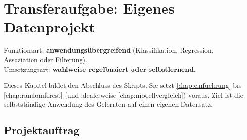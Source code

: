 \chapter{Transferaufgabe: Eigenes Datenprojekt}
\label{chap:transfer}

\begin{myremark}
Funktionsart: \textbf{anwendungsübergreifend} (Klassifikation, Regression, Assoziation oder Filterung). \\
Umsetzungsart: \textbf{wahlweise regelbasiert oder selbstlernend}.
\end{myremark}

\begin{myremark}
Dieses Kapitel bildet den Abschluss des Skripts.
Sie setzt  \cref{chap:einfuehrung} bis  \cref{chap:randomforest} (und idealerweise  \cref{chap:modellvergleich}) voraus.
Ziel ist die selbstständige Anwendung des Gelernten auf einen eigenen Datensatz.
\end{myremark}

\section{Projektauftrag}


